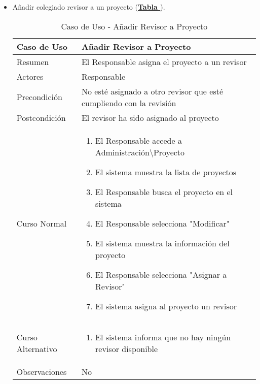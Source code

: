 \begin{itemize}
		\item \addtocounter{tabla}{1} Añadir colegiado revisor a un proyecto (\textbf{\hyperref[tab:curAsignarRevisorProyecto]{Tabla }}). 
		\begin{table}[!htbp]
		  \centering  \addtocounter{casouso}{1}
		  \begin{tabular}{|l | p{100mm}|}
		    \textbf{Caso de Uso}  & \textbf{Añadir Revisor a Proyecto} \\ \hline
		    Resumen 		 & El Responsable asigna el proyecto a un revisor \\ \hline
		    Actores  		 & Responsable \\ \hline
		    Precondición  	 & No esté asignado a otro revisor que esté cumpliendo con la revisión  \\ \hline
		    Postcondición  	 & El revisor ha sido asignado al proyecto \\ \hline
		    Curso Normal   	 & \begin{enumerate}
		      \item El Responsable accede a Administración\textbackslash Proyecto
			  \item El sistema muestra la lista de proyectos
			  \item El Responsable busca el proyecto en el sistema
			  \item El Responsable selecciona "Modificar"
			  \item El sistema muestra la información del proyecto
			  \item El Responsable selecciona "Asignar a Revisor"
			  \item El sistema asigna al proyecto un revisor
		    \end{enumerate}  \\ \hline
		    Curso Alternativo  & \begin{enumerate}
			  \item El sistema informa que no hay ningún revisor disponible
		    \end{enumerate}  \\ \hline
		    Observaciones 	 & No  \\ \hline
		  \end{tabular}
		  \caption{Caso de Uso  - Añadir Revisor a Proyecto}
		  \label{tab:curAsignarRevisorProyecto}
		\end{table}
		\FloatBarrier


\end{itemize}
